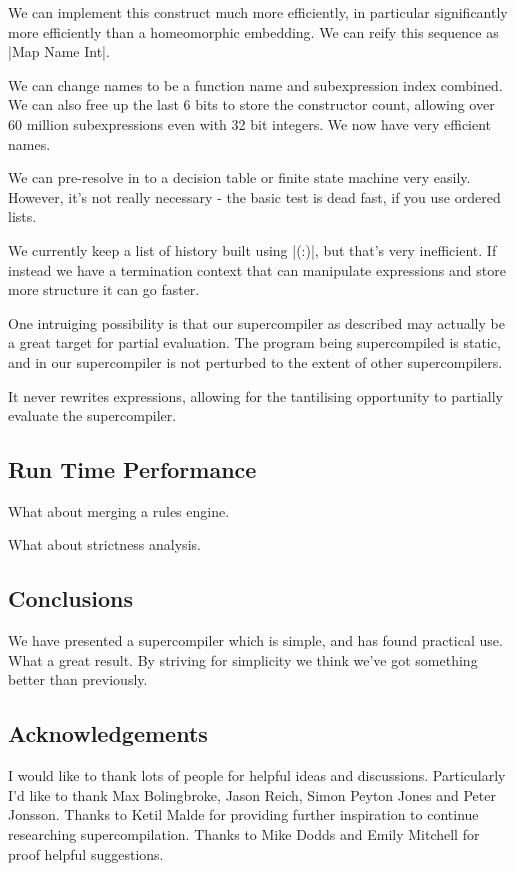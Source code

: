 \documentclass[draft]{sigplanconf}
\begin{document}
We can implement this construct much more efficiently, in particular significantly more efficiently than a homeomorphic embedding. We can reify this sequence as |Map Name Int|.

We can change names to be a function name and subexpression index combined. We can also free up the last 6 bits to store the constructor count, allowing over 60 million subexpressions even with 32 bit integers. We now have very efficient names.

We can pre-resolve in to a decision table or finite state machine very easily. However, it's not really necessary - the basic test is dead fast, if you use ordered lists.

We currently keep a list of history built using |(:)|, but that's very inefficient. If instead we have a termination context that can manipulate expressions and store more structure it can go faster.

One intruiging possibility is that our supercompiler as described may actually be a great target for partial evaluation. The program being supercompiled is static, and in our supercompiler is not perturbed to the extent of other supercompilers.

It never rewrites expressions, allowing for the tantilising opportunity to partially evaluate the supercompiler.


\subsection{Run Time Performance}

What about merging a rules engine.

What about strictness analysis.

\subsection{Conclusions}

We have presented a supercompiler which is simple, and has found practical use. What a great result. By striving for simplicity we think we've got something better than previously.


\subsection*{Acknowledgements}

I would like to thank lots of people for helpful ideas and discussions. Particularly I'd like to thank Max Bolingbroke, Jason Reich, Simon Peyton Jones and Peter Jonsson. Thanks to Ketil Malde for providing further inspiration to continue researching supercompilation. Thanks to Mike Dodds and Emily Mitchell for proof helpful suggestions.



\end{document}
